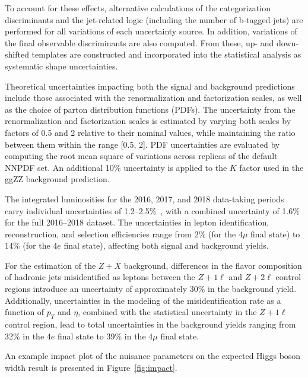 To account for these effects, alternative calculations of the categorization discriminants and the jet-related logic (including the number of b-tagged jets) are performed for all variations of each uncertainty source. In addition, variations of the final observable discriminants are also computed. From these, up- and down-shifted templates are constructed and incorporated into the statistical analysis as systematic shape uncertainties.

Theoretical uncertainties impacting both the signal and background predictions include those associated with the renormalization and factorization scales, as well as the choice of parton distribution functions (PDFs). The uncertainty from the renormalization and factorization scales is estimated by varying both scales by factors of 0.5 and 2 relative to their nominal values, while maintaining the ratio between them within the range [0.5, 2]. PDF uncertainties are evaluated by computing the root mean square of variations across replicas of the default NNPDF set. An additional 10\% uncertainty is applied to the $K$ factor used in the ggZZ background prediction.

The integrated luminosities for the 2016, 2017, and 2018 data-taking periods carry individual uncertainties of 1.2--2.5\%~\cite{CMS-LUM-17-003,CMS-PAS-LUM-17-004,CMS-PAS-LUM-18-002}, with a combined uncertainty of 1.6\% for the full 2016--2018 dataset. The uncertainties in lepton identification, reconstruction, and selection efficiencies range from 2\% (for the $4\mu$ final state) to 14\% (for the $4e$ final state), affecting both signal and background yields.

For the estimation of the $Z + X$ background, differences in the flavor composition of hadronic jets misidentified as leptons between the $Z + 1\ell$ and $Z + 2\ell$ control regions introduce an uncertainty of approximately 30\% in the background yield. Additionally, uncertainties in the modeling of the misidentification rate as a function of $p_T$ and $\eta$, combined with the statistical uncertainty in the $Z + 1\ell$ control region, lead to total uncertainties in the background yields ranging from 32\% in the $4e$ final state to 39\% in the $4\mu$ final state.

An example impact plot of the nuisance parameters on the expected Higgs boson width result is presented in Figure~\ref{fig:impact}.

